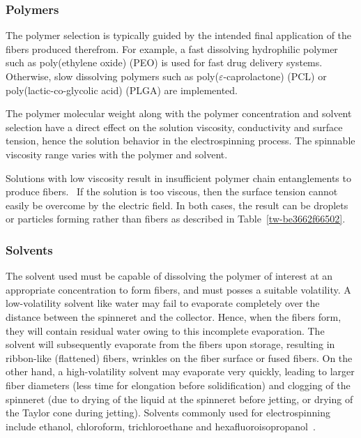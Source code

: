 \subsubsection{Polymers}The polymer selection is typically guided by the intended final application of the fibers produced therefrom. For example, a fast dissolving hydrophilic polymer such as poly(ethylene oxide) (PEO) is used for fast drug delivery systems. Otherwise, slow dissolving polymers such as poly($\varepsilon $-caprolactone) (PCL) or poly(lactic-co-glycolic acid) (PLGA) are implemented. \unskip~\cite{527120:13082763}

The polymer molecular weight along with the polymer concentration and solvent selection have a direct effect on the solution viscosity, conductivity and surface tension, hence the solution behavior in the electrospinning process. The spinnable viscosity range varies with the polymer and solvent. 

Solutions with low viscosity result in insufficient polymer chain entanglements to produce fibers.\unskip~\cite{527120:13082763} If the solution is too viscous, then the surface tension cannot easily be overcome by the electric field. In both cases, the result can be droplets or particles forming rather than fibers as described in Table~\ref{tw-be3662f66502}.



\subsubsection{Solvents}The solvent used must be capable of dissolving the polymer of interest at an appropriate concentration to form fibers, and must posses a suitable volatility. A low-volatility solvent like water may fail to evaporate completely over the distance between the spinneret and the collector. Hence, when the fibers form, they will contain residual water owing to this incomplete evaporation. The solvent will subsequently evaporate from the fibers upon storage, resulting in ribbon-like (flattened) fibers, wrinkles on the fiber surface or fused fibers. On the other hand, a high-volatility solvent may evaporate very quickly, leading to larger fiber diameters (less time for elongation before solidification) and clogging of the spinneret (due to drying of the liquid at the spinneret before jetting, or drying of the Taylor cone during jetting). Solvents commonly used for electrospinning include ethanol, chloroform, trichloroethane and hexafluoroisopropanol\unskip~\cite{527120:12073495,527120:16887323,527120:16887324}.

